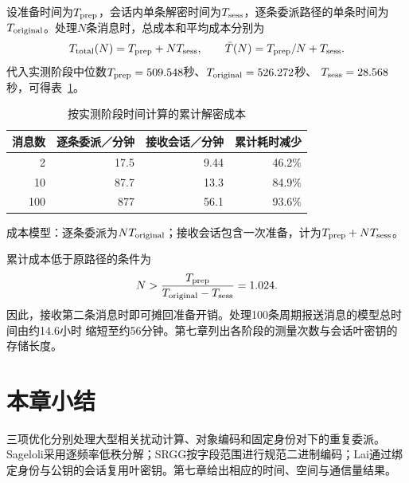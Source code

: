 \begin{mathchapterlayout}
设准备时间为$T_{\rm prep}$，会话内单条解密时间为$T_{\rm sess}$，逐条委派路径的单条时间为
$T_{\rm original}$。处理$N$条消息时，总成本和平均成本分别为
\[
 T_{\rm total}(N)=T_{\rm prep}+NT_{\rm sess},\qquad
 \bar T(N)=T_{\rm prep}/N+T_{\rm sess}.
\]
代入实测阶段中位数$T_{\rm prep}=509.548$秒、$T_{\rm original}=526.272$秒、
$T_{\rm sess}=28.568$秒，可得表~\ref{tab:session-amortization}。

\begin{table}[H]
\centering\small
\caption{按实测阶段时间计算的累计解密成本}
\label{tab:session-amortization}
\begin{tabular}{@{}rrrr@{}}
\toprule
\rowcolor{black!8} 消息数 & 逐条委派／分钟 & 接收会话／分钟 & 累计耗时减少 \\
\midrule
2 & 17.5 & 9.44 & 46.2\% \\
10 & 87.7 & 13.3 & 84.9\% \\
100 & 877 & 56.1 & 93.6\% \\
\bottomrule
\end{tabular}
\par\smallskip\begin{minipage}{.96\textwidth}\footnotesize
成本模型：逐条委派为$NT_{\rm original}$；接收会话包含一次准备，计为$T_{\rm prep}+NT_{\rm sess}$。
\end{minipage}
\end{table}

累计成本低于原路径的条件为
\[
 N>\frac{T_{\rm prep}}{T_{\rm original}-T_{\rm sess}}=1.024.
\]
因此，接收第二条消息时即可摊回准备开销。处理100条周期报送消息的模型总时间由约14.6小时
缩短至约56分钟。第七章列出各阶段的测量次数与会话叶密钥的存储长度。

\section{本章小结}

三项优化分别处理大型相关扰动计算、对象编码和固定身份对下的重复委派。Sageloli采用逐频率低秩分解；SRGG按字段范围进行规范二进制编码；Lai通过绑定身份与公钥的会话复用叶密钥。第七章给出相应的时间、空间与通信量结果。

\end{mathchapterlayout}
